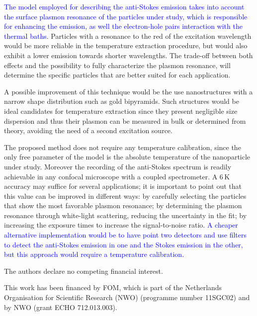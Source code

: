 \documentclass[journal=nalefd,manuscript=letter]{achemso}
\newcommand{\HI}[1]{\textcolor{blue}{#1}} %
\newcommand{\K}{\ensuremath{\,\textrm{K}}}
\begin{document}
\HI{The model employed for describing the anti-Stokes emission takes into account
the surface plasmon resonance of the particles under study, which is responsible 
for enhancing the emission, as well the electron-hole pairs
interaction with the thermal baths.}
Particles with a resonance to the red of the excitation wavelength would be more
reliable in the temperature extraction procedure, but would also exhibit a lower
emission towards shorter wavelengths. The trade-off between both effects and
the possibility to fully characterize the plasmon resonance, will determine the
specific particles that are better suited for each application.

A possible improvement of this technique would be the use nanostructures with a
narrow shape distribution such as gold bipyramids\cite{Pelton2009}. Such
structures would be ideal candidates for temperature extraction since they
present negligible size dispersion and thus their plasmon can be measured in
bulk or determined from theory, avoiding the need of a second excitation source.


The proposed method does not require any temperature calibration, since the only free
parameter of the model is the absolute temperature of the nanoparticle under
study. Moreover the recording of the anti-Stokes spectrum is readily achievable
in any confocal microscope with a coupled spectrometer. A $6\K$ accuracy may
suffice for several applications; it is important to point out that this value
can be improved in different ways: by carefully selecting the particles that
show the most favorable plasmon resonance; by determining the plasmon resonance
through white-light scattering, reducing the uncertainty in the fit; by
increasing the exposure times to increase the signal-to-noise ratio. 
\HI{A cheaper alternative implementation would be to have point two detectors and use 
filters to detect the anti-Stokes emission in one and the Stokes emission in the other, 
but this approach would require a temperature calibration.}

The authors declare no competing financial interest.

\begin{acknowledgement}
This work has been financed by FOM, which is part of the Netherlands Organisation for Scientific Research (NWO)
(programme number 11SGC02) and by NWO (grant ECHO 712.013.003). 
\end{acknowledgement}
\end{document}
